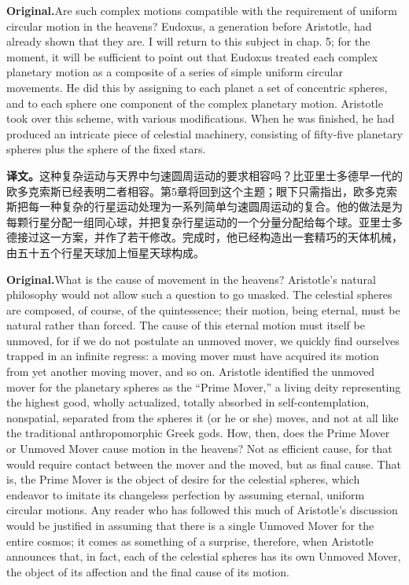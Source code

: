 \documentclass[UTF8]{ctexart}
\newcommand{\orig}{\par\noindent\textbf{Original.}\quad}
\newcommand{\zh}{\par\noindent\textbf{译文。}\quad}
\begin{document}
\orig Are such complex motions compatible with the requirement of uniform circular motion in the heavens? Eudoxus, a generation before Aristotle, had already shown that they are. I will return to this subject in chap. 5; for the moment, it will be sufficient to point out that Eudoxus treated each complex planetary motion as a composite of a series of simple uniform circular movements. He did this by assigning to each planet a set of concentric spheres, and to each sphere one component of the complex planetary motion. Aristotle took over this scheme, with various modifications. When he was finished, he had produced an intricate piece of celestial machinery, consisting of fifty-five planetary spheres plus the sphere of the fixed stars.

\zh 这种复杂运动与天界中匀速圆周运动的要求相容吗？比亚里士多德早一代的欧多克索斯已经表明二者相容。第5章将回到这个主题；眼下只需指出，欧多克索斯把每一种复杂的行星运动处理为一系列简单匀速圆周运动的复合。他的做法是为每颗行星分配一组同心球，并把复杂行星运动的一个分量分配给每个球。亚里士多德接过这一方案，并作了若干修改。完成时，他已经构造出一套精巧的天体机械，由五十五个行星天球加上恒星天球构成。

\orig What is the cause of movement in the heavens? Aristotle's natural philosophy would not allow such a question to go unasked. The celestial spheres are composed, of course, of the quintessence; their motion, being eternal, must be natural rather than forced. The cause of this eternal motion must itself be unmoved, for if we do not postulate an unmoved mover, we quickly find ourselves trapped in an infinite regress: a moving mover must have acquired its motion from yet another moving mover, and so on. Aristotle identified the unmoved mover for the planetary spheres as the ``Prime Mover,'' a living deity representing the highest good, wholly actualized, totally absorbed in self-contemplation, nonspatial, separated from the spheres it (or he or she) moves, and not at all like the traditional anthropomorphic Greek gods. How, then, does the Prime Mover or Unmoved Mover cause motion in the heavens? Not as efficient cause, for that would require contact between the mover and the moved, but as final cause. That is, the Prime Mover is the object of desire for the celestial spheres, which endeavor to imitate its changeless perfection by assuming eternal, uniform circular motions. Any reader who has followed this much of Aristotle's discussion would be justified in assuming that there is a single Unmoved Mover for the entire cosmos; it comes as something of a surprise, therefore, when Aristotle announces that, in fact, each of the celestial spheres has its own Unmoved Mover, the object of its affection and the final cause of its motion.
\end{document}
